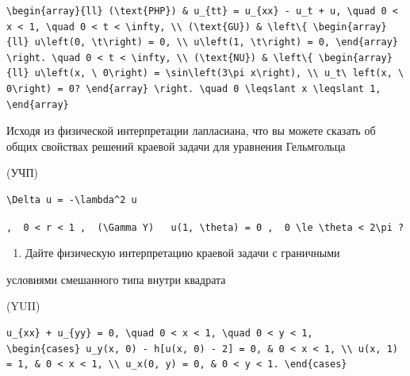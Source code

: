 \documentclass[
  ukrainian,
]{article}
\providecommand{\tightlist}{%
  \setlength{\itemsep}{0pt}\setlength{\parskip}{0pt}}
\begin{document}
\begin{verbatim}
\begin{array}{ll} (\text{PHP}) & u_{tt} = u_{xx} - u_t + u, \quad 0 < x < 1, \quad 0 < t < \infty, \\ (\text{GU}) & \left\{ \begin{array}{ll} u\left(0, \t\right) = 0, \\ u\left(1, \t\right) = 0, \end{array} \right. \quad 0 < t < \infty, \\ (\text{NU}) & \left\{ \begin{array}{ll} u\left(x, \ 0\right) = \sin\left(3\pi x\right), \\ u_t\ left(x, \ 0\right) = 0? \end{array} \right. \quad 0 \leqslant x \leqslant 1, \end{array}
\end{verbatim}

Исходя из физической интерпретации лапласиана, что вы можете сказать об
общих свойствах решений краевой задачи для уравнения Гельмгольца

(УЧП)

\begin{verbatim}
\Delta u = -\lambda^2 u
\end{verbatim}

\texttt{,\ \ \textquotesingle{}0\ \textless{}\ r\ \textless{}\ 1\textquotesingle{}\ ,\ \ \textquotesingle{}(\textbackslash{}Gamma\ Y)\textquotesingle{}\ \ \ \textquotesingle{}u(1,\ \textbackslash{}theta)\ =\ 0\textquotesingle{}\ ,\ \ \textquotesingle{}0\ \textbackslash{}le\ \textbackslash{}theta\ \textless{}\ 2\textbackslash{}pi\textquotesingle{}\ ?}

\begin{enumerate}
\def\labelenumi{\arabic{enumi}.}
\setcounter{enumi}{5}
\tightlist
\item
  Дайте физическую интерпретацию краевой задачи с граничными
\end{enumerate}

условиями смешанного типа внутри квадрата

(YUII)

\begin{verbatim}
u_{xx} + u_{yy} = 0, \quad 0 < x < 1, \quad 0 < y < 1,
\begin{cases} u_y(x, 0) - h[u(x, 0) - 2] = 0, & 0 < x < 1, \\ u(x, 1) = 1, & 0 < x < 1, \\ u_x(0, y) = 0, & 0 < y < 1. \end{cases}
\end{verbatim}
\end{document}
